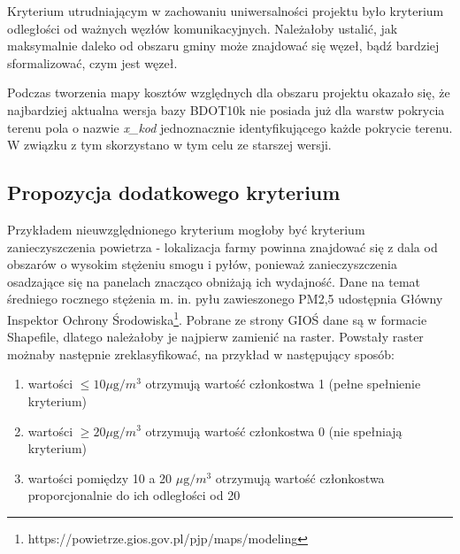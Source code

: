 \documentclass{article}
\begin{document}
Kryterium utrudniającym w zachowaniu uniwersalności projektu było kryterium odległości od ważnych węzłów komunikacyjnych. Należałoby ustalić, jak maksymalnie daleko od obszaru gminy może znajdować się węzeł, bądź bardziej sformalizować, czym jest węzeł. 

Podczas tworzenia mapy kosztów względnych dla obszaru projektu okazało się, że najbardziej aktualna wersja bazy BDOT10k nie posiada już dla warstw pokrycia terenu pola o nazwie \textit{x\_kod} jednoznacznie identyfikującego każde pokrycie terenu. W związku z tym skorzystano w tym celu ze starszej wersji.

\subsection{Propozycja dodatkowego kryterium}
Przykładem nieuwzględnionego kryterium mogłoby być kryterium zanieczyszczenia powietrza - lokalizacja farmy powinna znajdować się z dala od obszarów o wysokim stężeniu smogu i pyłów, ponieważ zanieczyszczenia osadzające się na panelach znacząco obniżają ich wydajność. Dane na temat średniego rocznego stężenia m. in. pyłu zawieszonego PM2,5 udostępnia Główny Inspektor Ochrony Środowiska\footnote{https://powietrze.gios.gov.pl/pjp/maps/modeling}. Pobrane ze strony GIOŚ dane są w formacie Shapefile, dlatego należałoby je najpierw zamienić na raster. Powstały raster możnaby następnie zreklasyfikować, na przykład w następujący sposób:
\begin{enumerate}[label=•]
    \item wartości \( \leq 10  \mu\mathrm{g}/m^3 \) otrzymują wartość członkostwa 1 (pełne spełnienie kryterium)
    \item wartości \( \geq 20 \mu\mathrm{g}/m^3 \) otrzymują wartość członkostwa 0 (nie spełniają kryterium)
    \item wartości pomiędzy 10 a 20 \( \mu\mathrm{g}/m^3 \) otrzymują wartość członkostwa proporcjonalnie do ich odległości od 20
\end{enumerate}
\end{document}
